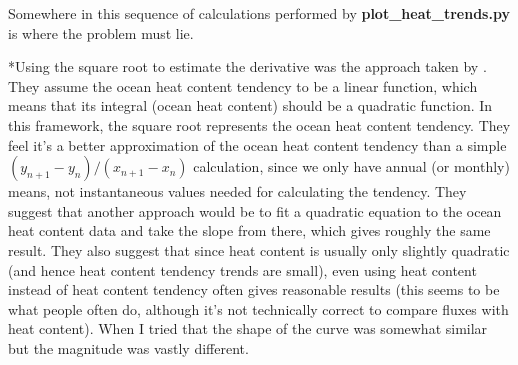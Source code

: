 Somewhere in this sequence of calculations performed by \textbf{plot_heat_trends.py} is where the problem must lie.

*Using the square root to estimate the derivative was the approach taken by \citet{Nummelin_2017}. They assume the ocean heat content tendency to be a linear function, which means that its integral (ocean heat content) should be a quadratic function. In this framework, the square root represents the ocean heat content tendency. They feel it's a better approximation of the ocean heat content tendency than a simple $(y_{n+1} - y_n) / (x_{n+1} - x_n)$ calculation, since we only have annual (or monthly) means, not instantaneous values needed for calculating the tendency. They suggest that another approach would be to fit a quadratic equation to the ocean heat content data and take the slope from there, which gives roughly the same result. They also suggest that since heat content is usually only slightly quadratic (and hence heat content tendency trends are small), even using heat content instead of heat content tendency often gives reasonable results (this seems to be what people often do, although it's not technically correct to compare fluxes with heat content). When I tried that the shape of the curve was somewhat similar but the magnitude was vastly different.
